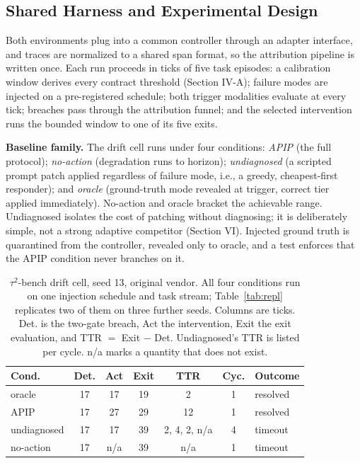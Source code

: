 \documentclass[conference]{IEEEtran}
\begin{document}
\subsection{Shared Harness and Experimental Design}

Both environments plug into a common controller through an adapter interface, and traces are normalized to a shared span format, so the attribution pipeline is written once. Each run proceeds in ticks of five task episodes: a calibration window derives every contract threshold (Section IV-A); failure modes are injected on a pre-registered schedule; both trigger modalities evaluate at every tick; breaches pass through the attribution funnel; and the selected intervention runs the bounded window to one of its five exits.

\textbf{Baseline family.} The drift cell runs under four conditions: \emph{APIP} (the full protocol); \emph{no-action} (degradation runs to horizon); \emph{undiagnosed} (a scripted prompt patch applied regardless of failure mode, i.e., a greedy, cheapest-first responder); and \emph{oracle} (ground-truth mode revealed at trigger, correct tier applied immediately). No-action and oracle bracket the achievable range. Undiagnosed isolates the cost of patching without diagnosing; it is deliberately simple, not a strong adaptive competitor (Section VI). Injected ground truth is quarantined from the controller, revealed only to oracle, and a test enforces that the APIP condition never branches on it.

\begin{table}[!t]
\caption{$\tau^2$-bench drift cell, seed 13, original vendor. All four conditions run on one injection schedule and task stream; Table~\ref{tab:repl} replicates two of them on three further seeds. Columns are ticks. Det. is the two-gate breach, Act the intervention, Exit the exit evaluation, and TTR $=$ Exit $-$ Det. Undiagnosed's TTR is listed per cycle. n/a marks a quantity that does not exist.}
\label{tab:drift}
\centering
\footnotesize
\begin{tabular}{lcccccl}
\hline
Cond. & Det. & Act & Exit & TTR & Cyc. & Outcome \\
\hline
oracle & 17 & 17 & 19 & 2 & 1 & resolved \\
APIP & 17 & 27 & 29 & 12 & 1 & resolved \\
undiagnosed & 17 & 17 & 39 & 2, 4, 2, n/a & 4 & timeout \\
no-action & 17 & n/a & 39 & n/a & 1 & timeout \\
\hline
\end{tabular}
\end{table}
\end{document}
